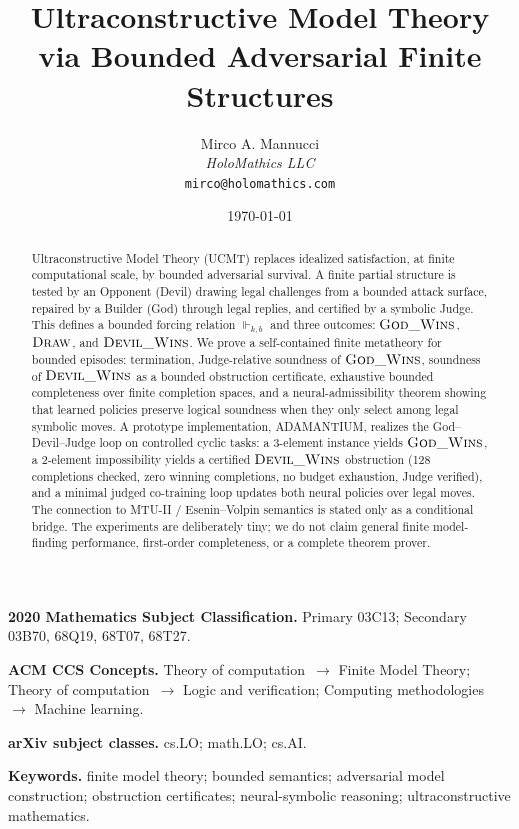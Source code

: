 \documentclass[11pt]{article}
\title{Ultraconstructive Model Theory via Bounded Adversarial Finite Structures}
\author{
  Mirco A. Mannucci\\
  \textit{HoloMathics LLC}\\
  \texttt{mirco@holomathics.com}
}
\date{\today}
\theoremstyle{definition}
\theoremstyle{plain}
\newcommand{\kbforces}{\Vdash_{k,b}}      %
\begin{document}
\maketitle


\begin{abstract}
Ultraconstructive Model Theory (UCMT) replaces idealized satisfaction, at finite computational scale,
by bounded adversarial survival.  A finite partial structure is tested by an Opponent (Devil) drawing
legal challenges from a bounded attack surface, repaired by a Builder (God) through legal replies, and
certified by a symbolic Judge.  This defines a bounded forcing relation $\kbforces$ and three outcomes:
$\textsc{God\_Wins}$, $\textsc{Draw}$, and $\textsc{Devil\_Wins}$.  We prove a self-contained finite
metatheory for bounded episodes: termination, Judge-relative soundness of $\textsc{God\_Wins}$, soundness
of $\textsc{Devil\_Wins}$ as a bounded obstruction certificate, exhaustive bounded completeness over finite
completion spaces, and a neural-admissibility theorem showing that learned policies preserve logical
soundness when they only select among legal symbolic moves.  A prototype implementation, ADAMANTIUM,
realizes the God--Devil--Judge loop on controlled cyclic tasks: a $3$-element instance yields
$\textsc{God\_Wins}$, a $2$-element impossibility yields a certified $\textsc{Devil\_Wins}$ obstruction
(128 completions checked, zero winning completions, no budget exhaustion, Judge verified), and a minimal
judged co-training loop updates both neural policies over legal moves.  The connection to MTU-II /
Esenin--Volpin semantics is stated only as a conditional bridge.  The experiments are deliberately tiny;
we do not claim general finite model-finding performance, first-order completeness, or a complete theorem
prover.
\end{abstract}

\medskip
\noindent\textbf{2020 Mathematics Subject Classification.}
Primary 03C13; Secondary 03B70, 68Q19, 68T07, 68T27.

\noindent\textbf{ACM CCS Concepts.}
Theory of computation~$\rightarrow$ Finite Model Theory; Theory of computation~$\rightarrow$ Logic and verification;
Computing methodologies~$\rightarrow$ Machine learning.

\noindent\textbf{arXiv subject classes.}
cs.LO; math.LO; cs.AI.

\noindent\textbf{Keywords.}
finite model theory; bounded semantics; adversarial model construction; obstruction certificates;
neural-symbolic reasoning; ultraconstructive mathematics.
\end{document}
